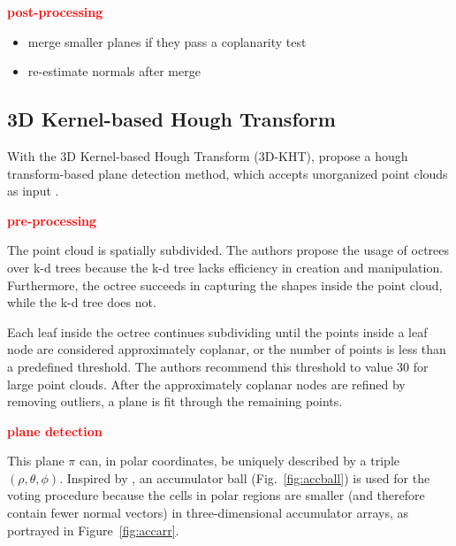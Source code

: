 \documentclass[main.tex]{subfiles}
\begin{document}
\textbf{\textcolor{red}{post-processing}}
\begin{itemize}
    \item merge smaller planes if they pass a coplanarity test
    \item re-estimate normals after merge
\end{itemize}

\subsection{3D Kernel-based Hough Transform}\label{sub:3dkht}
With the 3D Kernel-based Hough Transform (3D-KHT),
\citeauthor{Limberger_Oliveira_2015}\cite{Limberger_Oliveira_2015} propose a hough transform-based plane detection method,
which accepts unorganized point clouds as input \cite{Limberger_Oliveira_2015}.

\textbf{\textcolor{red}{pre-processing}}

The point cloud is spatially subdivided. The authors propose the usage of octrees over k-d trees because the k-d tree lacks efficiency in creation and manipulation.
Furthermore, the octree succeeds in capturing the shapes inside the point cloud, while the k-d tree does not.

Each leaf inside the octree continues subdividing until the points inside a leaf node are considered approximately coplanar, or the number of points is less than a predefined threshold.
The authors recommend this threshold to value 30 for large point clouds.
After the approximately coplanar nodes are refined by removing outliers, a plane is fit through the remaining points.

\textbf{\textcolor{red}{plane detection}}

This plane $\pi$ can, in polar coordinates, be uniquely described by a triple $(\rho, \theta, \phi)$.
Inspired by \citeauthor{Borrmann_Elseberg_Lingemann_Nüchter_2011}\cite{Borrmann_Elseberg_Lingemann_Nüchter_2011}, an accumulator ball (Fig.~\ref{fig:accball}) is used for the voting procedure because the cells in polar regions are smaller (and therefore
contain fewer normal vectors) in three-dimensional accumulator arrays, as portrayed in Figure~\ref{fig:accarr}.
\end{document}
